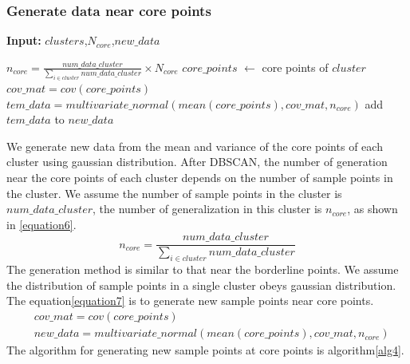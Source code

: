 \documentclass[runningheads]{llncs}
\begin{document}
\subsubsection{Generate data near core points}
\begin{algorithm}[tb]
  \caption{$generate\_core$}
  \label{alg4}
  \hspace*{0.02in} {\bf Input:} $clusters$,$N_{core}$,$new\_data$
  \begin{algorithmic}
    \State $n_{core}=\frac{num\_data\_cluster}{\sum_{i \in cluster} num\_data\_cluster} \times N_{core}$
    \State $core\_points$ $\leftarrow$ core points of $cluster$
    \State $cov\_mat=cov(core\_points)$
    \State $tem\_data=multivariate\_normal(mean(core\_points),cov\_mat,n_{core})$
    \State add $tem\_data$ to $new\_data$
  \EndFor
  \end{algorithmic}
\end{algorithm}
We generate new data from the mean and variance of the 
core points of each cluster using gaussian distribution.
After DBSCAN, 
the number of generation near the core points of each cluster depends 
on the number of sample points in the cluster.
We assume the number of sample points in the cluster is $num\_data\_cluster$, 
 the number of generalization in this cluster is $n_{core}$, as shown in \ref{equation6}.
 \begin{equation}
  \label{equation6}
  n_{core}=\frac{num\_data\_cluster}{\sum_{i \in cluster} num\_data\_cluster}
\end{equation}
The generation method is similar to that near the borderline points. 
We assume the distribution of sample points in a single cluster obeys gaussian distribution.
The equation\ref{equation7} is to generate new sample points near core points.
\begin{equation}
  \label{equation7}
  \begin{aligned}
    & cov\_mat=cov(core\_points) \\
    & new\_data=multivariate\_normal(mean(core\_points),cov\_mat,n_{core})
  \end{aligned}
\end{equation}
The algorithm for generating new sample points at core points is algorithm\ref{alg4}.

\end{document}
